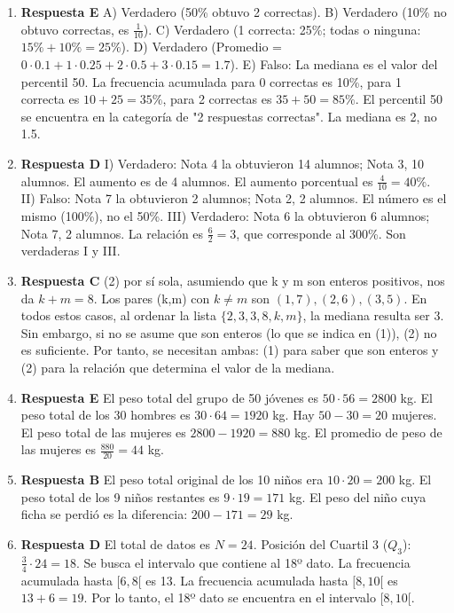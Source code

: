 \documentclass[11pt]{article}
\begin{document}
\begin{enumerate}
    \item \textbf{Respuesta E} A) Verdadero (50\% obtuvo 2 correctas). B) Verdadero (10\% no obtuvo correctas, es $\frac{1}{10}$). C) Verdadero (1 correcta: 25\%; todas o ninguna: $15\%+10\%=25\%$). D) Verdadero (Promedio = $0\cdot0.1+1\cdot0.25+2\cdot0.5+3\cdot0.15 = 1.7$). E) Falso: La mediana es el valor del percentil 50. La frecuencia acumulada para 0 correctas es 10\%, para 1 correcta es $10+25=35\%$, para 2 correctas es $35+50=85\%$. El percentil 50 se encuentra en la categoría de "2 respuestas correctas". La mediana es 2, no 1.5. %
    
    \item \textbf{Respuesta D} I) Verdadero: Nota 4 la obtuvieron 14 alumnos; Nota 3, 10 alumnos. El aumento es de 4 alumnos. El aumento porcentual es $\frac{4}{10} = 40\%$. II) Falso: Nota 7 la obtuvieron 2 alumnos; Nota 2, 2 alumnos. El número es el mismo (100\%), no el 50\%. III) Verdadero: Nota 6 la obtuvieron 6 alumnos; Nota 7, 2 alumnos. La relación es $\frac{6}{2} = 3$, que corresponde al 300\%. Son verdaderas I y III. %

    \item \textbf{Respuesta C} (2) por sí sola, asumiendo que k y m son enteros positivos, nos da $k+m=8$. Los pares (k,m) con $k \neq m$ son $(1,7), (2,6), (3,5)$. En todos estos casos, al ordenar la lista $\{2,3,3,8,k,m\}$, la mediana resulta ser 3. Sin embargo, si no se asume que son enteros (lo que se indica en (1)), (2) no es suficiente. Por tanto, se necesitan ambas: (1) para saber que son enteros y (2) para la relación que determina el valor de la mediana. %
    
    \item \textbf{Respuesta E} El peso total del grupo de 50 jóvenes es $50 \cdot 56 = 2800$ kg. El peso total de los 30 hombres es $30 \cdot 64 = 1920$ kg. Hay $50-30=20$ mujeres. El peso total de las mujeres es $2800 - 1920 = 880$ kg. El promedio de peso de las mujeres es $\frac{880}{20} = 44$ kg. %
    
    \item \textbf{Respuesta B} El peso total original de los 10 niños era $10 \cdot 20 = 200$ kg. El peso total de los 9 niños restantes es $9 \cdot 19 = 171$ kg. El peso del niño cuya ficha se perdió es la diferencia: $200 - 171 = 29$ kg. %
    
    \item \textbf{Respuesta D} El total de datos es $N=24$. Posición del Cuartil 3 ($Q_3$): $\frac{3}{4} \cdot 24 = 18$. Se busca el intervalo que contiene al 18º dato. La frecuencia acumulada hasta $[6,8[$ es 13. La frecuencia acumulada hasta $[8,10[$ es $13+6=19$. Por lo tanto, el 18º dato se encuentra en el intervalo $[8,10[$. %
    

\end{enumerate}
\end{document}
